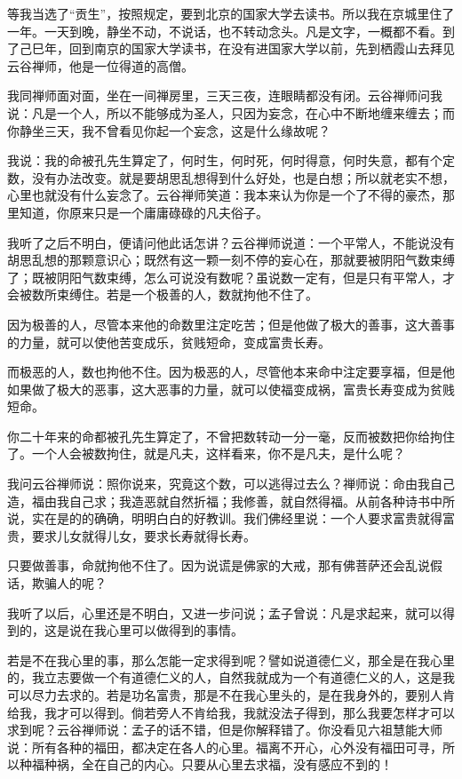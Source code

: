 \documentclass[12pt,twoside,openany]{book}
\begin{document}
等我当选了“贡生”，按照规定，要到北京的国家大学去读书。所以我在京城里住了一年。一天到晚，静坐不动，不说话，也不转动念头。凡是文字，一概都不看。到了己巳年，回到南京的国家大学读书，在没有进国家大学以前，先到栖霞山去拜见云谷禅师，他是一位得道的高僧。

我同禅师面对面，坐在一间禅房里，三天三夜，连眼睛都没有闭。云谷禅师问我说：凡是一个人，所以不能够成为圣人，只因为妄念，在心中不断地缠来缠去；而你静坐三天，我不曾看见你起一个妄念，这是什么缘故呢？

我说：我的命被孔先生算定了，何时生，何时死，何时得意，何时失意，都有个定数，没有办法改变。就是要胡思乱想得到什么好处，也是白想；所以就老实不想，心里也就没有什么妄念了。云谷禅师笑道：我本来认为你是一个了不得的豪杰，那里知道，你原来只是一个庸庸碌碌的凡夫俗子。

我听了之后不明白，便请问他此话怎讲？云谷禅师说道：一个平常人，不能说没有胡思乱想的那颗意识心；既然有这一颗一刻不停的妄心在，那就要被阴阳气数束缚了；既被阴阳气数束缚，怎么可说没有数呢？虽说数一定有，但是只有平常人，才会被数所束缚住。若是一个极善的人，数就拘他不住了。

因为极善的人，尽管本来他的命数里注定吃苦；但是他做了极大的善事，这大善事的力量，就可以使他苦变成乐，贫贱短命，变成富贵长寿。

而极恶的人，数也拘他不住。因为极恶的人，尽管他本来命中注定要享福，但是他如果做了极大的恶事，这大恶事的力量，就可以使福变成祸，富贵长寿变成为贫贱短命。

你二十年来的命都被孔先生算定了，不曾把数转动一分一毫，反而被数把你给拘住了。一个人会被数拘住，就是凡夫，这样看来，你不是凡夫，是什么呢？

我问云谷禅师说：照你说来，究竟这个数，可以逃得过去么？禅师说：命由我自己造，福由我自己求；我造恶就自然折福；我修善，就自然得福。从前各种诗书中所说，实在是的的确确，明明白白的好教训。我们佛经里说：一个人要求富贵就得富贵，要求儿女就得儿女，要求长寿就得长寿。

只要做善事，命就拘他不住了。因为说谎是佛家的大戒，那有佛菩萨还会乱说假话，欺骗人的呢？

我听了以后，心里还是不明白，又进一步问说；孟子曾说：凡是求起来，就可以得到的，这是说在我心里可以做得到的事情。

若是不在我心里的事，那么怎能一定求得到呢？譬如说道德仁义，那全是在我心里的，我立志要做一个有道德仁义的人，自然我就成为一个有道德仁义的人，这是我可以尽力去求的。若是功名富贵，那是不在我心里头的，是在我身外的，要别人肯给我，我才可以得到。倘若旁人不肯给我，我就没法子得到，那么我要怎样才可以求到呢？云谷禅师说：孟子的话不错，但是你解释错了。你没看见六祖慧能大师说：所有各种的福田，都决定在各人的心里。福离不开心，心外没有福田可寻，所以种福种祸，全在自己的内心。只要从心里去求福，没有感应不到的！
\end{document}
